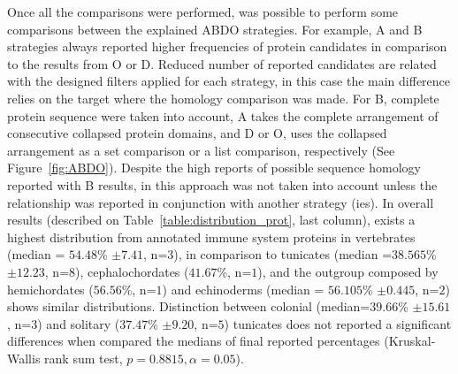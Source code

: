 \documentclass[11pt]{article}
\begin{document}

Once all the comparisons were performed, was possible to perform some
comparisons between the explained ABDO strategies. For example, A and B
strategies always reported higher frequencies of protein candidates in
comparison to the results from O or D. Reduced number of reported candidates are
related with the designed filters applied for each strategy, in this case the
main difference relies on the target where the homology comparison was made. For
B, complete protein sequence were taken into account, A takes the complete
arrangement of consecutive collapsed protein domains, and D or O, uses the
collapsed arrangement as a set comparison or a list comparison, respectively
(See Figure~\ref{fig:ABDO}). Despite the high reports of possible sequence
homology reported with B results, in this approach was not taken into account
unless the relationship was reported in conjunction with another strategy (ies). In
overall results (described on Table~\ref{table:distribution_prot}, last
column), exists a highest distribution from annotated immune system proteins 
in vertebrates (median = $54.48$\% $\pm 7.41$, n=$3$), in comparison to tunicates 
(median =$38.565$\% $\pm 12.23$, n=$8$), cephalochordates ($41.67$\%, n=$1$), and 
the outgroup composed by hemichordates ($56.56$\%, n=$1$) and echinoderms (median = 
$56.105$\% $\pm 0.445$, n=$2$) shows similar distributions. Distinction between
colonial (median=$39.66$\% $\pm 15.61$, n=$3$) and solitary ($37.47$\% $\pm
9.20$, n=$5$) tunicates does not reported a significant differences when
compared the medians of final reported percentages (Kruskal-Wallis rank sum
test, $p=0.8815, \alpha=0.05$).
\end{document}
